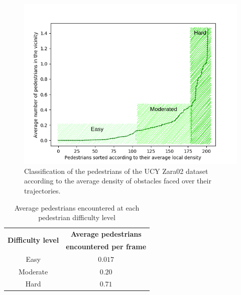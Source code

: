 \begin{figure}[htbp]
	\centering
	\includegraphics[width=0.8\linewidth]{plots/zara02_ped_density_divisions.png}
	\caption{Classification of the pedestrians of the UCY Zara02 dataset according to the average density of obstacles faced over their trajectories.}
	\label{fig:zara02_ped_density_division}
\end{figure}
\begin{table}[htbp]
	\begin{center}
		\renewcommand{\arraystretch}{1.3}
		\begin{tabular}{|c|c|}
			\hline
			\multirow{2}{*}{\textbf{Difficulty level}} & \textbf{Average pedestrians} \\
			& \textbf{encountered per frame} \\
			\hline
			Easy & $0.017$ \\
			Moderate & $0.20$ \\
			Hard & $0.71$\\
			\hline
		\end{tabular}
	\caption{Average pedestrians encountered at each pedestrian difficulty level}
	\label{tab:zara02_difficulty_level_division}
	\end{center}
\end{table}

